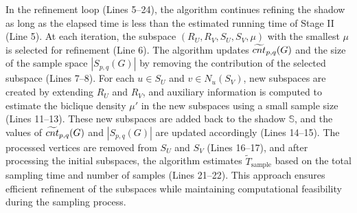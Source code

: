 In the refinement loop (Lines 5–24), the algorithm continues refining the shadow as long as the elapsed time is less than the estimated running time of Stage II (Line 5). At each iteration, the subspace $(R_U, R_V, S_U, S_V, \mu)$ with the smallest $\mu$ is selected for refinement (Line 6). The algorithm updates $\widetilde{cnt}_{p,q}(G)$ and the size of the sample space $|S_{p,q}(G)|$ by removing the contribution of the selected subspace (Lines 7–8). For each $u \in S_U$ and $v \in N_u(S_V)$, new subspaces are created by extending $R_U$ and $R_V$, and auxiliary information is computed to estimate the biclique density $\mu'$ in the new subspaces using a small sample size (Lines 11–13). These new subspaces are added back to the shadow $\mathbb{S}$, and the values of $\widetilde{cnt}_{p,q}(G)$ and $|S_{p,q}(G)|$ are updated accordingly (Lines 14–15). The processed vertices are removed from $S_U$ and $S_V$ (Lines 16–17), and after processing the initial subspaces, the algorithm estimates $\tilde{T}_{\text{sample}}$ based on the total sampling time and number of samples (Lines 21–22). This approach ensures efficient refinement of the subspaces while maintaining computational feasibility during the sampling process.

